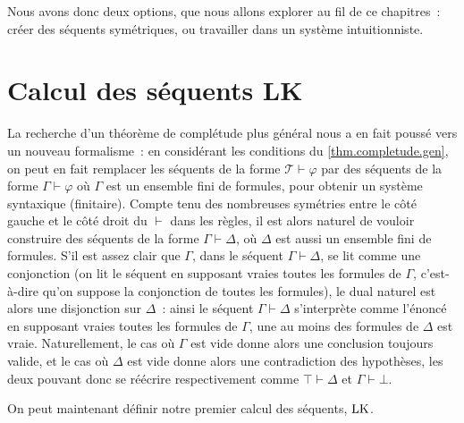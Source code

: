 Nous avons donc deux options, que nous allons explorer au fil de ce chapitres~:
créer des séquents symétriques, ou travailler dans un système intuitionniste.

\section{Calcul des séquents LK}

La recherche d'un théorème de complétude plus général nous a en fait poussé vers
un nouveau formalisme~: en considérant les conditions du
\cref{thm.completude.gen}, on peut en fait remplacer les séquents de la forme
$\mathcal T \vdash \varphi$ par des séquents de la forme $\Gamma \vdash \varphi$
où $\Gamma$ est un ensemble fini de formules, pour obtenir un système
syntaxique (finitaire). Compte tenu des nombreuses symétries entre le côté
gauche et le côté droit du $\vdash$ dans les règles, il est alors naturel de
vouloir construire des séquents de la forme $\Gamma\vdash \Delta$, où
$\Delta$ est aussi un ensemble fini de formules. S'il est assez clair que
$\Gamma$, dans le séquent $\Gamma\vdash \Delta$, se lit comme une conjonction
(on lit le séquent \og en supposant vraies toutes les formules de $\Gamma$\fg,
c'est-à-dire qu'on suppose la conjonction de toutes les formules), le dual
naturel est alors une disjonction sur $\Delta$~: ainsi le séquent
$\Gamma\vdash \Delta$ s'interprète comme l'énoncé \og en supposant vraies toutes
les formules de $\Gamma$, une au moins des formules de $\Delta$ est vraie\fg.
Naturellement, le cas où $\Gamma$ est vide donne alors une conclusion toujours
valide, et le cas où $\Delta$ est vide donne alors une contradiction des
hypothèses, les deux pouvant donc se réécrire respectivement comme
$\top \vdash \Delta$ et $\Gamma\vdash \bot$.

On peut maintenant définir notre premier calcul des séquents, $\operatorname{LK}$.

